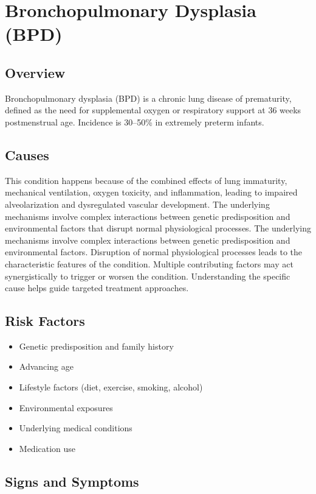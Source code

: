 \chapter{Bronchopulmonary Dysplasia (BPD)}
\label{sec:Bronchopulmonary Dysplasia}

\section{Overview}
Bronchopulmonary dysplasia (BPD) is a chronic lung disease of prematurity, defined as the need for supplemental oxygen or respiratory support at 36 weeks postmenstrual age. Incidence is 30--50\% in extremely preterm infants.
\section{Causes}
This condition happens because of the combined effects of lung immaturity, mechanical ventilation, oxygen toxicity, and inflammation, leading to impaired alveolarization and dysregulated vascular development. The underlying mechanisms involve complex interactions between genetic predisposition and environmental factors that disrupt normal physiological processes. The underlying mechanisms involve complex interactions between genetic predisposition and environmental factors. Disruption of normal physiological processes leads to the characteristic features of the condition. Multiple contributing factors may act synergistically to trigger or worsen the condition. Understanding the specific cause helps guide targeted treatment approaches.
\section{Risk Factors}


\begin{itemize}[noitemsep]
  \item Genetic predisposition and family history
  \item Advancing age
  \item Lifestyle factors (diet, exercise, smoking, alcohol)
  \item Environmental exposures
  \item Underlying medical conditions
  \item Medication use
\end{itemize}
\section{Signs and Symptoms}

